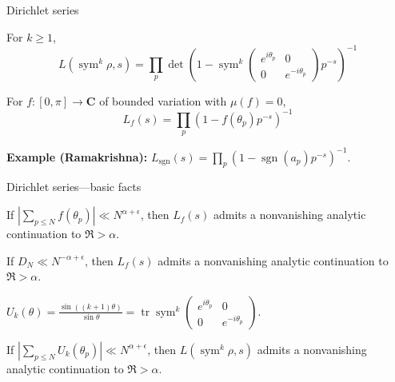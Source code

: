 \documentclass[handout]{beamer}
\DeclareMathOperator{\sgn}{sgn}
\DeclareMathOperator{\sym}{sym}
\DeclareMathOperator{\tr}{tr}
\newcommand{\bC}{\mathbf{C}}
\begin{document}
\begin{frame}{Dirichlet series}
\begin{definition}
For $k\geqslant 1$, 
\[
	L(\sym^k \rho,s) = \prod_p \det\left( 1 - \sym^k \left(\begin{smallmatrix} e^{i \theta_p} & 0\\ 0 & e^{-i \theta_p}\end{smallmatrix}\right) p^{-s}\right)^{-1}
\]
\end{definition}
\pause

\begin{definition}
For $f\colon [0,\pi] \to \bC$ of bounded variation with $\mu(f) = 0$,  
\[
	L_f(s) = \prod_p \left( 1 - f(\theta_p) p^{-s}\right)^{-1}
\]
\end{definition}
\pause

\textbf{Example (Ramakrishna):}
$L_{\sgn}(s) = \prod_p \left(1 - \sgn(a_p) p^{-s}\right)^{-1}$. 
\end{frame}

\begin{frame}{Dirichlet series---basic facts}
\begin{theorem}
If $\left| \sum_{p\leqslant N} f(\theta_p)\right| \ll N^{\alpha+\epsilon}$, 
then $L_f(s)$ admits a nonvanishing analytic continuation to $\Re > \alpha$. 
\end{theorem}
\pause

\begin{corollary}
If $D_N \ll N^{-\alpha+\epsilon}$, then $L_f(s)$ admits a nonvanishing 
analytic continuation to $\Re > \alpha$. 
\end{corollary}
\pause

\begin{definition}
$U_k(\theta) = \frac{\sin((k+1)\theta)}{\sin\theta} = \tr\sym^k \left(\begin{smallmatrix} e^{i \theta_p} & 0\\ 0 & e^{-i \theta_p}\end{smallmatrix}\right)$.
\end{definition}
\pause

\begin{theorem}
If $\left| \sum_{p\leqslant N} U_k(\theta_p)\right| \ll N^{\alpha+\epsilon}$, 
then $L(\sym^k\rho, s)$ admits a nonvanishing analytic continuation to 
$\Re > \alpha$. 
\end{theorem}
\end{frame}
\end{document}
